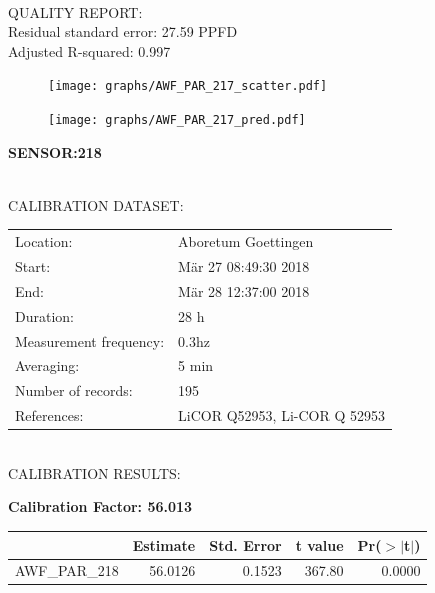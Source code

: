 \documentclass[oneside]{report}
\begin{document}
\hrulefill\\
QUALITY REPORT:\\
Residual standard error: 27.59 PPFD\\
Adjusted R-squared: 0.997



\begin{figure}[H]
  \centering
  \texttt{[image: graphs/AWF\_PAR\_217\_scatter.pdf]}
\end{figure}




\begin{figure}[H]
  \centering
  \texttt{[image: graphs/AWF\_PAR\_217\_pred.pdf]}
\end{figure}

\pagebreak


\begin{center}
\large{\textbf{SENSOR:218}}\\
\end{center}

\hrulefill\\
CALIBRATION DATASET:\\
\begin{table}[h!]
  \centering
  \label{tab:table1}
  \begin{tabular}{ll}
    Location: & Aboretum Goettingen\\ 
    
    
    Start:  & Mär 27 08:49:30 2018 \\
    End:   & Mär 28 12:37:00 2018\\ 
    Duration: & 28 h\\
    Measurement frequency: & 0.3hz\\
    Averaging:  &5 min\\
    Number of records: & 195 \\
    References: & LiCOR Q52953, Li-COR Q 52953 \\
  \end{tabular}
\end{table}

\hrulefill\\
CALIBRATION RESULTS:\\


\begin{center}
\textbf{\large{Calibration Factor: 56.013}}\\
\end{center}
\begin{table}[ht]
\centering
\begin{tabular}{rrrrr}
  \hline
 & Estimate & Std. Error & t value & Pr($>$$|$t$|$) \\ 
  \hline
AWF\_PAR\_218 & 56.0126 & 0.1523 & 367.80 & 0.0000 \\ 
   \hline
\end{tabular}
\end{table}
\end{document}

